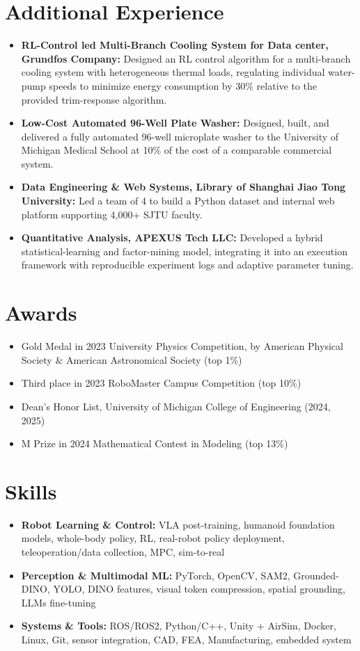 \documentclass[11pt,letterpaper]{article}
\newcommand{\resumeItem}[1]{
    \item #1
}
\begin{document}
\section*{Additional Experience}

\begin{itemize}[leftmargin=1.4em, itemsep=3pt, topsep=2pt]
    \small
    \resumeItem{\textbf{RL-Control led Multi-Branch Cooling System for Data center, Grundfos Company:} Designed an RL control algorithm for a multi-branch cooling system with heterogeneous thermal loads, regulating individual water-pump speeds to minimize energy consumption by 30\% relative to the provided trim-response algorithm.}
    \resumeItem{\textbf{Low-Cost Automated 96-Well Plate Washer:} Designed, built, and delivered a fully automated 96-well microplate washer to the University of Michigan Medical School at 10\% of the cost of a comparable commercial system.}
    \resumeItem{\textbf{Data Engineering \& Web Systems, Library of Shanghai Jiao Tong University:} Led a team of 4 to build a Python dataset and internal web platform supporting 4,000+ SJTU faculty.}
    \resumeItem{\textbf{Quantitative Analysis, APEXUS Tech LLC:} Developed a hybrid statistical-learning and factor-mining model, integrating it into an execution framework with reproducible experiment logs and adaptive parameter tuning.}
\end{itemize}

\section*{Awards}

\begin{itemize}
    \resumeItem{Gold Medal in 2023 University Physics Competition, by American Physical Society \& American Astronomical Society (top 1\%)}
    \resumeItem{Third place in 2023 RoboMaster Campus Competition (top 10\%)}
    \resumeItem{Dean's Honor List, University of Michigan College of Engineering (2024, 2025)}
    \resumeItem{M Prize in 2024 Mathematical Contest in Modeling (top 13\%)}
\end{itemize}

\section*{Skills}

\begin{itemize}
\resumeItem{\textbf{Robot Learning \& Control:} VLA post-training, humanoid foundation models, whole-body policy, RL, real-robot policy deployment, teleoperation/data collection, MPC, sim-to-real}
\resumeItem{\textbf{Perception \& Multimodal ML:} PyTorch, OpenCV, SAM2, Grounded-DINO, YOLO, DINO features, visual token compression, spatial grounding, LLMs fine-tuning}
\resumeItem{\textbf{Systems \& Tools:} ROS/ROS2, Python/C++, Unity + AirSim, Docker, Linux, Git, sensor integration, CAD, FEA, Manufacturing, embedded system}
\end{itemize}
\end{document}

